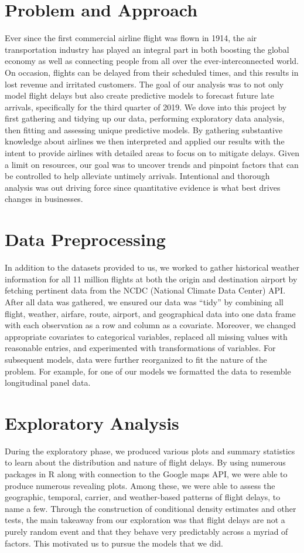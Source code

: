 \documentclass[12pt, a4paper, openany]{book}
\newcommand\tab[1][1cm]{\hspace*{#1}}
\begin{document}
	\section{Problem and Approach}
\tab Ever since the first commercial airline flight was flown in 1914, the air transportation industry has played an integral part in both boosting the global economy as well as connecting people from all over the ever-interconnected world. On occasion, flights can be delayed from their scheduled times, and this results in lost revenue and irritated customers. The goal of our analysis was to not only model flight delays but also create predictive models to forecast future late arrivals, specifically for the third quarter of 2019. We dove into this project by first gathering and tidying up our data, performing exploratory data analysis, then fitting and assessing unique predictive models. By gathering substantive knowledge about airlines we then interpreted and applied our results with the intent to provide airlines with detailed areas to focus on to mitigate delays. Given a limit on resources, our goal was to uncover trends and pinpoint factors that can be controlled to help alleviate untimely arrivals. Intentional and thorough analysis was out driving force since quantitative evidence is what best drives changes in businesses.
	\section{Data Preprocessing}
\tab In addition to the datasets provided to us, we worked to gather historical weather information for all 11 million flights at both the origin and destination airport by fetching pertinent data from the NCDC (National Climate Data Center) API. After all data was gathered, we ensured our data was “tidy” by combining all flight, weather, airfare, route, airport, and geographical data into one data frame with each observation as a row and column as a covariate. Moreover, we changed appropriate covariates to categorical variables, replaced all missing values with reasonable entries, and experimented with transformations of variables. For subsequent models, data were further reorganized to fit the nature of the problem. For example, for one of our models we formatted the data to resemble longitudinal panel data. 
	\section{Exploratory Analysis}
\tab During the exploratory phase, we produced various plots and summary statistics to learn about the distribution and nature of flight delays. By using numerous packages in R along with connection to the Google maps API, we were able to produce numerous revealing plots. Among these, we were able to assess the geographic, temporal, carrier, and weather-based patterns of flight delays, to name a few. Through the construction of conditional density estimates and other tests, the main takeaway from our exploration was that flight delays are not a purely random event and that they behave very predictably across a myriad of factors. This motivated us to pursue the models that we did. 
\end{document}
